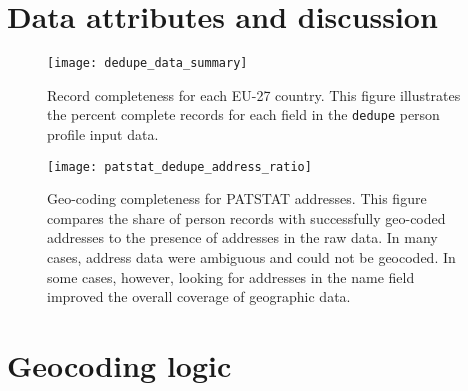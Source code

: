\documentclass[11pt]{article}
\begin{document}






\appendix

\section{Data attributes and discussion}
\label{sec:data-attr-disc}

\begin{figure}[ht]
  \centering
  \texttt{[image: dedupe\_data\_summary]}
  \caption{Record completeness for each EU-27 country. This figure illustrates the percent complete records for each field in the \texttt{dedupe} person profile input data. }
  \label{fig:profile-completeness}
\end{figure}

\begin{figure}[ht]
  \centering
  \texttt{[image: patstat\_dedupe\_address\_ratio]}
  \caption{Geo-coding completeness for PATSTAT addresses. This figure compares the share of person records with successfully geo-coded addresses to the presence of addresses in the raw data. In many cases, address data were ambiguous and could not be geocoded. In some cases, however, looking for addresses in the name field improved the overall coverage of geographic data. }
  \label{fig:addr-geocoded-shares}
\end{figure}

\FloatBarrier
\section{Geocoding logic}
\label{sec:geocoding-logic}
\end{document}
